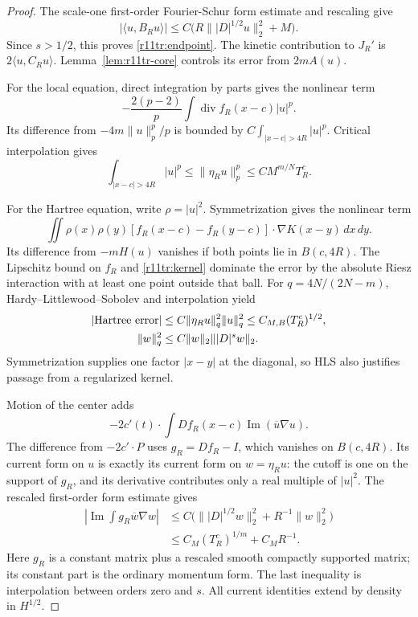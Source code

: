 \begin{proof}
The scale-one first-order Fourier-Schur form estimate and rescaling give
\[
 |\langle u,B_Ru\rangle|
 \le C\bigl(R\||D|^{1/2}u\|_2^2+M\bigr).
\]
Since $s>1/2$, this proves \eqref{r11tr:endpoint}. The kinetic
contribution to $J_R'$ is $2\langle u,C_Ru\rangle$.
Lemma~\ref{lem:r11tr-core} controls its error from $2mA(u)$.

For the local equation, direct integration by parts gives the nonlinear
term
\[
 -\frac{2(p-2)}p\int\operatorname{div}f_R(x-c)|u|^p.
\]
Its difference from $-4m\|u\|_p^p/p$ is bounded by
$C\int_{|x-c|>4R}|u|^p$. Critical interpolation gives
\begin{equation}\label{r11tr:local-tail}
 \int_{|x-c|>4R}|u|^p
 \le\|\eta_Ru\|_p^p\le C M^{m/N}T_R^c.
\end{equation}

For the Hartree equation, write $\rho=|u|^2$. Symmetrization gives
the nonlinear term
\[
 \iint\rho(x)\rho(y)
  [f_R(x-c)-f_R(y-c)]\cdot\nabla K(x-y)\,dx\,dy.
\]
Its difference from $-mH(u)$ vanishes if both points lie in
$B(c,4R)$. The Lipschitz bound on $f_R$ and
\eqref{r11tr:kernel} dominate the error by the absolute Riesz
interaction with at least one point outside that ball. For
$q=4N/(2N-m)$, Hardy--Littlewood--Sobolev and interpolation yield
\begin{align}
 |\text{Hartree error}|
 &\le C\|\eta_Ru\|_q^2\|u\|_q^2
 \le C_{M,B}(T_R^c)^{1/2},\label{r11tr:hartree-tail}\\
 \|w\|_q^2&\le C\|w\|_2\||D|^sw\|_2.\notag
\end{align}
Symmetrization supplies one factor $|x-y|$ at the diagonal, so HLS
also justifies passage from a regularized kernel.

Motion of the center adds
\[
 -2c'(t)\cdot\int Df_R(x-c)\operatorname{Im}(\overline u\nabla u).
\]
The difference from $-2c'\cdot P$ uses $g_R=Df_R-I$, which
vanishes on $B(c,4R)$. Its current form on $u$ is exactly its
current form on $w=\eta_Ru$: the cutoff is one on the support
of $g_R$, and its derivative contributes only a real multiple of
$|u|^2$. The rescaled first-order form estimate gives
\begin{align*}
 \left|\operatorname{Im}\int g_R\overline w\nabla w\right|
 &\le C\bigl(\||D|^{1/2}w\|_2^2+R^{-1}\|w\|_2^2\bigr)\\
 &\le C_M(T_R^c)^{1/m}+C_MR^{-1}.
\end{align*}
Here $g_R$ is a constant matrix plus a rescaled smooth compactly
supported matrix; its constant part is the ordinary momentum form.
The last inequality is interpolation between orders zero and $s$.
All current identities extend by density in $H^{1/2}$.


\end{proof}
